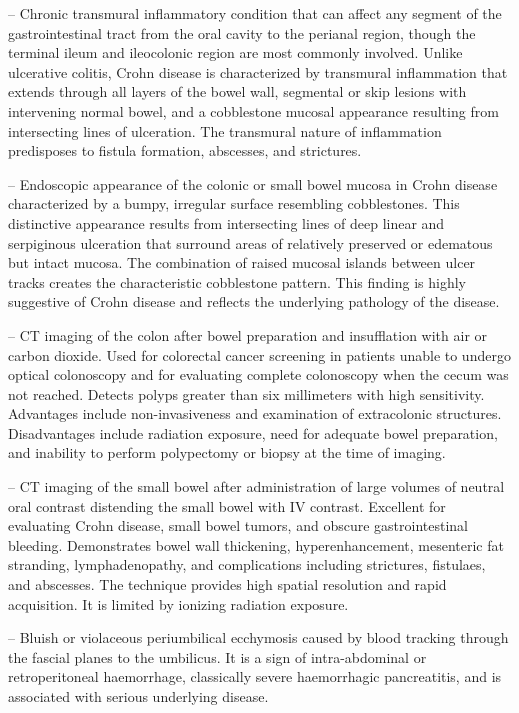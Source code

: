 -- Chronic transmural inflammatory condition that can affect any segment of the gastrointestinal tract from the oral cavity to the perianal region, though the terminal ileum and ileocolonic region are most commonly involved. Unlike ulcerative colitis, Crohn disease is characterized by transmural inflammation that extends through all layers of the bowel wall, segmental or skip lesions with intervening normal bowel, and a cobblestone mucosal appearance resulting from intersecting lines of ulceration. The transmural nature of inflammation predisposes to fistula formation, abscesses, and strictures.

-- Endoscopic appearance of the colonic or small bowel mucosa in Crohn disease characterized by a bumpy, irregular surface resembling cobblestones. This distinctive appearance results from intersecting lines of deep linear and serpiginous ulceration that surround areas of relatively preserved or edematous but intact mucosa. The combination of raised mucosal islands between ulcer tracks creates the characteristic cobblestone pattern. This finding is highly suggestive of Crohn disease and reflects the underlying pathology of the disease.

-- CT imaging of the colon after bowel preparation and insufflation with air or carbon dioxide. Used for colorectal cancer screening in patients unable to undergo optical colonoscopy and for evaluating complete colonoscopy when the cecum was not reached. Detects polyps greater than six millimeters with high sensitivity. Advantages include non-invasiveness and examination of extracolonic structures. Disadvantages include radiation exposure, need for adequate bowel preparation, and inability to perform polypectomy or biopsy at the time of imaging.

-- CT imaging of the small bowel after administration of large volumes of neutral oral contrast distending the small bowel with IV contrast. Excellent for evaluating Crohn disease, small bowel tumors, and obscure gastrointestinal bleeding. Demonstrates bowel wall thickening, hyperenhancement, mesenteric fat stranding, lymphadenopathy, and complications including strictures, fistulaes, and abscesses. The technique provides high spatial resolution and rapid acquisition. It is limited by ionizing radiation exposure.

-- Bluish or violaceous periumbilical ecchymosis caused by blood tracking through the fascial planes to the umbilicus. It is a sign of intra-abdominal or retroperitoneal haemorrhage, classically severe haemorrhagic pancreatitis, and is associated with serious underlying disease.

